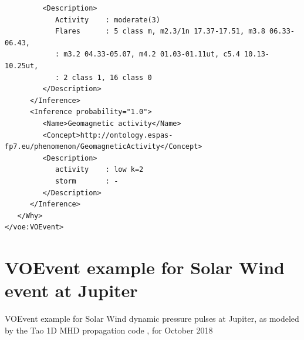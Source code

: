 \documentclass[referee,a4paper,12pt,traditabstract]{swsc}
\begin{document}
\begin{linenumbers}
{\begin{verbatim}
         <Description>
            Activity    : moderate(3)
            Flares      : 5 class m, m2.3/1n 17.37-17.51, m3.8 06.33-06.43,
            : m3.2 04.33-05.07, m4.2 01.03-01.11ut, c5.4 10.13-10.25ut,
            : 2 class 1, 16 class 0
         </Description>
      </Inference>
      <Inference probability="1.0">
         <Name>Geomagnetic activity</Name>
         <Concept>http://ontology.espas-fp7.eu/phenomenon/GeomagneticActivity</Concept>
         <Description>
            activity    : low k=2
            storm       : -
         </Description>
      </Inference>
   </Why>
</voe:VOEvent>
\end{verbatim}
}

\section{VOEvent example for Solar Wind event at Jupiter}
\label{appendix-xml-voevent-tao}
VOEvent example for Solar Wind dynamic pressure pulses at Jupiter, as modeled by the Tao 1D MHD propagation code \cite{Tao:2005dp}, for October 2018


\end{linenumbers}
\end{document}
